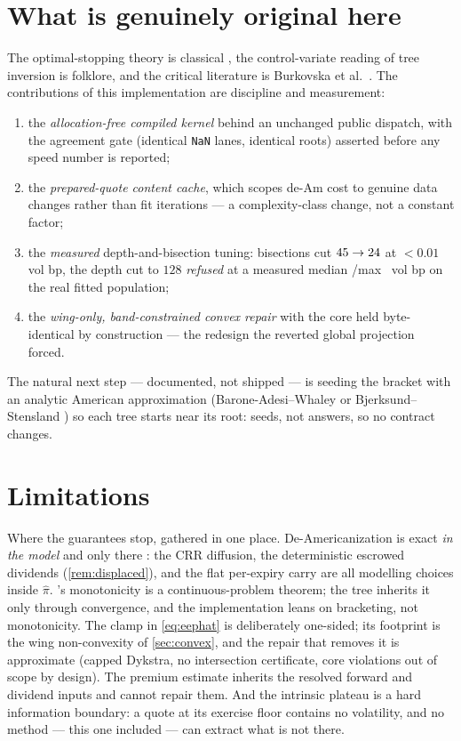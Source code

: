 \documentclass[11pt]{article}
\begin{document}
\section{What is genuinely original here}
\label{sec:original}

The optimal-stopping theory is classical
\cite{Merton1973,PeskirShiryaev2006}, the control-variate reading of tree
inversion is folklore, and the critical literature is Burkovska et
al.~\cite{Burkovska2018}.  The contributions of this implementation are
discipline and measurement:
\begin{enumerate}[leftmargin=1.6em]
\item the \emph{allocation-free compiled kernel} behind an unchanged
public dispatch, with the agreement gate (identical \texttt{NaN} lanes,
identical roots) asserted before any speed number is reported;
\item the \emph{prepared-quote content cache}, which scopes de-Am cost to
genuine data changes rather than fit iterations --- a complexity-class
change, not a constant factor;
\item the \emph{measured} depth-and-bisection tuning: bisections cut
$45\to24$ at $<0.01$ vol bp, the depth cut to $128$ \emph{refused}
at a measured median \deamstdepthrealmed/max \deamstdepthrealmax\ vol bp
on the real fitted population;
\item the \emph{wing-only, band-constrained convex repair} with the
core held byte-identical by construction --- the redesign the reverted
global projection forced.
\end{enumerate}
The natural next step --- documented, not shipped --- is seeding the
bracket with an analytic American approximation (Barone-Adesi--Whaley
\cite{BaroneAdesiWhaley1987} or Bjerksund--Stensland
\cite{BjerksundStensland2002}) so each tree starts near its root: seeds,
not answers, so no contract changes.

\section{Limitations}
\label{sec:limits}

Where the guarantees stop, gathered in one place.  De-Americanization is
exact \emph{in the model} and only there \cite{Burkovska2018}: the CRR
diffusion, the deterministic escrowed dividends
(\cref{rem:displaced}), and the flat per-expiry carry are all modelling
choices inside $\hat\pi$.  's monotonicity is a
continuous-problem theorem; the tree inherits it only through convergence,
and the implementation leans on bracketing, not monotonicity.  The clamp
in \cref{eq:eephat} is deliberately one-sided; its footprint is the wing
non-convexity of \cref{sec:convex}, and the repair that removes it is
approximate (capped Dykstra, no intersection certificate, core violations
out of scope by design).  The premium estimate inherits the resolved
forward and dividend inputs and cannot repair them.  And the intrinsic
plateau is a hard information boundary: a quote at its exercise floor
contains no volatility, and no method --- this one included --- can
extract what is not there.
\end{document}
